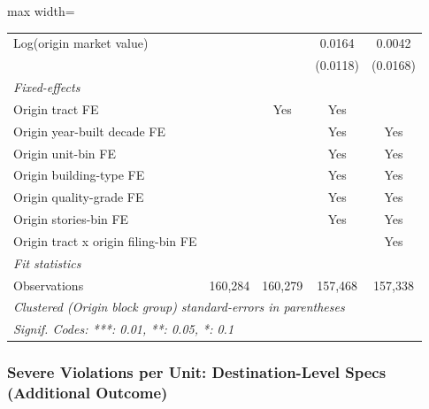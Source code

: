 \documentclass[
  11pt,
]{article}
\begin{document}
\begin{adjustbox}{max width=\textwidth}
\begin{tabular}{lcccc}
   Log(origin market value)                       &          &          & 0.0164          & 0.0042\\   
                                                  &          &          & (0.0118)        & (0.0168)\\   
   \midrule
   \emph{Fixed-effects}\\
   Origin tract FE                                &          & Yes      & Yes             & \\  
   Origin year-built decade FE                    &          &          & Yes             & Yes\\  
   Origin unit-bin FE                             &          &          & Yes             & Yes\\  
   Origin building-type FE                        &          &          & Yes             & Yes\\  
   Origin quality-grade FE                        &          &          & Yes             & Yes\\  
   Origin stories-bin FE                          &          &          & Yes             & Yes\\  
   Origin tract x origin filing-bin FE            &          &          &                 & Yes\\  
   \midrule
   \emph{Fit statistics}\\
   Observations                                   & 160,284  & 160,279  & 157,468         & 157,338\\  
   \midrule \midrule
   \multicolumn{5}{l}{\emph{Clustered (Origin block group) standard-errors in parentheses}}\\
   \multicolumn{5}{l}{\emph{Signif. Codes: ***: 0.01, **: 0.05, *: 0.1}}\\
\end{tabular}
\par\endgroup

\end{adjustbox}

\subsubsection{Severe Violations per Unit: Destination-Level Specs
(Additional
Outcome)}\label{severe-violations-per-unit-destination-level-specs-additional-outcome}
\end{document}

